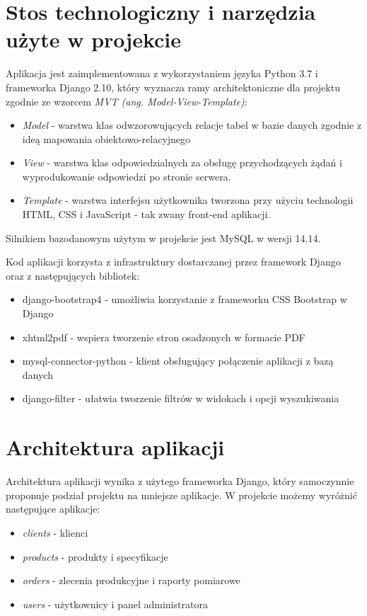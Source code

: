 \documentclass[declaration,shortabstract]{iithesis}
\begin{document}
\chapter{Stos technologiczny i narzędzia użyte w projekcie}
Aplikacja jest zaimplementowana z wykorzystaniem języka Python 3.7 i frameworka Django 2.10, który wyznacza ramy architektoniczne dla projektu zgodnie ze wzorcem \emph{MVT (ang. Model-View-Template)}:
\begin{itemize}
	\item \emph{Model} - warstwa klas odwzorowujących relacje tabel w bazie danych zgodnie z ideą mapowania obiektowo-relacyjnego 
	\item \emph{View} - warstwa klas odpowiedzialnych za obsługę przychodzących żądań i wyprodukowanie odpowiedzi po stronie serwera.
	\item \emph{Template} - warstwa interfejsu użytkownika tworzona przy użyciu technologii HTML, CSS i JavaScript - tak zwany front-end aplikacji.
\end{itemize}
	
Silnikiem bazodanowym użytym w projekcie jest MySQL w wersji 14.14.

Kod aplikacji korzysta z infrastruktury dostarczanej przez framework Django oraz z następujących bibliotek:
\begin{itemize}
	\item django-bootstrap4 - umożliwia korzystanie z frameworku CSS Bootstrap w Django
	\item xhtml2pdf - wspiera tworzenie stron osadzonych w formacie PDF
	\item mysql-connector-python - klient obsługujący połączenie aplikacji z bazą danych
	\item django-filter - ułatwia tworzenie filtrów w widokach i opcji wyszukiwania
\end{itemize}

\chapter{Architektura aplikacji}
Architektura aplikacji wynika z użytego frameworka Django, który samoczynnie proponuje podział projektu na mniejsze aplikacje. W projekcie możemy wyróżnić następujące aplikacje:
\begin{itemize}
	\item \emph{clients} - klienci
	\item \emph{products} - produkty i specyfikacje
	\item \emph{orders} - zlecenia produkcyjne i raporty pomiarowe
	\item \emph{users} - użytkownicy i panel administratora 
\end{itemize}
\end{document}
